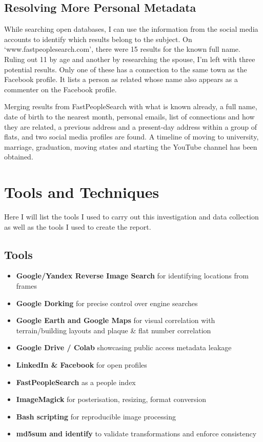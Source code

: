 \documentclass[a4paper,11pt]{report}
\begin{document}
\subsection{Resolving More Personal Metadata}

While searching open databases, I can use the information from the social media accounts to identify which results belong to the subject. On `www.fastpeoplesearch.com', there were 15 results for the known full name. Ruling out 11 by age and another by researching the spouse, I’m left with three potential results. Only one of these has a connection to the same town as the Facebook profile. It lists a person as related whose name also appears as a commenter on the Facebook profile.

Merging results from FastPeopleSearch with what is known already, a full name, date of birth to the nearest month, personal emails, list of connections and how they are related, a previous address and a present-day address within a group of flats, and two social media profiles are found. A timeline of moving to university, marriage, graduation, moving states and starting the YouTube channel has been obtained.

\section{Tools and Techniques}

Here I will list the tools I used to carry out this investigation and data collection as well as the tools I used to create the report.

\subsection{Tools}

\begin{itemize}
    \item \textbf{Google/Yandex Reverse Image Search} for identifying locations from frames
    \item \textbf{Google Dorking} for precise control over engine searches
    \item \textbf{Google Earth and Google Maps} for visual correlation with terrain/building layouts and plaque \& flat number correlation
    \item \textbf{Google Drive / Colab} showcasing public access metadata leakage
    \item \textbf{LinkedIn \& Facebook} for open profiles
    \item \textbf{FastPeopleSearch} as a people index
    \item \textbf{ImageMagick} for posterisation, resizing, format conversion
    \item \textbf{Bash scripting} for reproducible image processing
    \item \textbf{md5sum and identify} to validate transformations and enforce consistency
\end{itemize}
\end{document}
